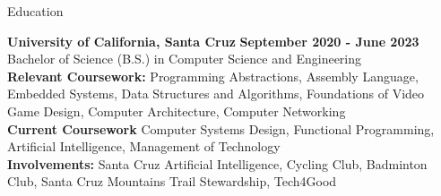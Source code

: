 \documentclass{resume}
\begin{document}
\begin{rSection}{\large Education}

{\bf University of California, Santa Cruz} \hfill {\bf{September 2020 - June 2023}}
\\ Bachelor of Science (B.S.) in Computer Science and Engineering\hfill %
\\ \textbf{Relevant Coursework:} Programming Abstractions, Assembly Language, Embedded Systems, Data Structures and Algorithms, Foundations of Video Game Design, Computer Architecture, Computer Networking
\\ \textbf{Current Coursework} Computer Systems Design, Functional Programming, Artificial Intelligence, Management of Technology 
\\ \textbf{Involvements:}  Santa Cruz Artificial Intelligence, Cycling Club, Badminton Club, Santa Cruz Mountains Trail Stewardship, Tech4Good 

\end{rSection}
\end{document}
